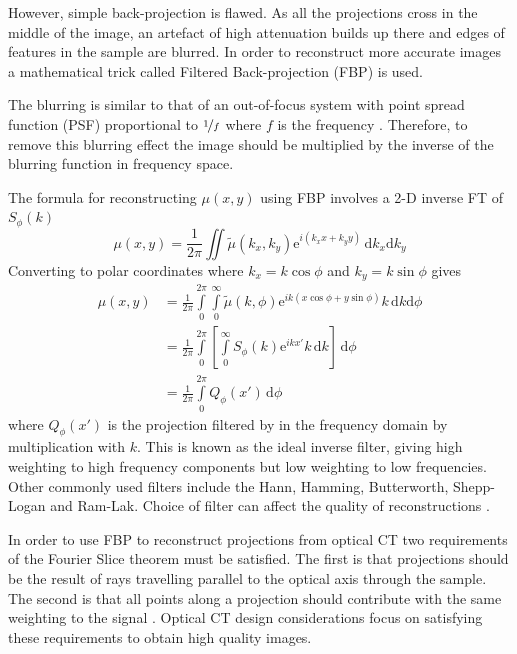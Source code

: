 	However, simple back-projection is flawed. As all the projections cross in the middle of the image, an artefact of high attenuation builds up there and edges of features in the sample are blurred.  In order to reconstruct more accurate images a mathematical trick called Filtered Back-projection (FBP) is used. 
	
	The blurring is similar to that of an out-of-focus system with point spread function (PSF) proportional to $\nicefrac{1}{f}$ where $f$ is the frequency \cite{russ2002image}. Therefore, to remove this blurring effect the image should be multiplied by the inverse of the blurring function in frequency space.
	
	The formula for reconstructing $\mu(x,y)$ using FBP involves a 2-D inverse FT of $S_{\phi}(k)$
	\begin{equation}
	\mu(x,y) = \frac{1}{2\pi} \iint \tilde{\mu}(k_x,k_y) \mathrm{e}^{i\left(k_xx+k_yy\right)}\, \mathrm{d}k_x\mathrm{d}k_y
	\end{equation}
	Converting to polar coordinates where $k_x=k\cos\phi$ and $k_y=k\sin\phi$ gives
	\begin{align}
	\mu(x,y) &= \frac{1}{2\pi} \int\limits_0^{2\pi} \int\limits_0^{\infty} \tilde{\mu}(k,\phi) \mathrm{e}^{ik\left(x\cos\phi+y\sin\phi\right)}k\, \mathrm{d}k\mathrm{d}\phi \\
	&= \frac{1}{2\pi} \int\limits_0^{2\pi}\left[\int\limits_0^{\infty}S_{\phi}(k)\mathrm{e}^{ikx'}k\, \mathrm{d}k \right]\, \mathrm{d}\phi \\
	&= \frac{1}{2\pi} \int\limits_0^{2\pi}Q_{\phi}(x')\, \mathrm{d}\phi
	\end{align}
	where $Q_{\phi}(x')$ is the projection filtered by in the frequency domain by multiplication with $k$. This is known as the ideal inverse filter, giving high weighting to high frequency components but low weighting to low frequencies. Other commonly used filters include the Hann,  Hamming, Butterworth, Shepp-Logan and Ram-Lak. Choice of filter can affect the quality of reconstructions \cite{russ2002image}.
	
	In order to use  FBP to reconstruct projections from optical CT two requirements of the Fourier Slice theorem must be satisfied. The first is that projections should be the result of rays travelling parallel to the optical axis through the sample. The second is that all points along a projection should contribute with the same weighting to the signal \cite{Wang:2007}. Optical CT design considerations focus on satisfying these requirements to obtain high quality images.
	
